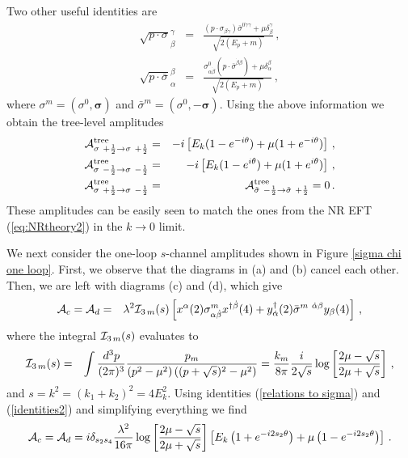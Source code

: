 \documentclass[11pt]{article}
\begin{document}
%
Two other useful identities are  
%
\begin{eqnarray}
\nonumber
\sqrt{p\cdot \sigma}_{\beta}^\gamma&=&\frac{(p\cdot \sigma_{\beta\dot\gamma})\bar\sigma^{0\dot\gamma\gamma}+\mu\delta_{\beta}^\gamma}{\sqrt{2(E_p+m)}}\,,\\
\sqrt{p\cdot \bar\sigma}_{\alpha}^\beta&=&\frac{\sigma^{0}_{\alpha\dot \beta}(p\cdot \bar\sigma^{\dot\beta\beta})+\mu\delta_{\alpha}^\beta}{\sqrt{2(E_p+m)}}\,,
\label{identities2}
\end{eqnarray}
% 
where $\sigma^m=(\sigma^0,\bm \sigma)$ and $\bar\sigma^m=(\sigma^0,-\bm \sigma)$.  Using the above information we obtain the tree-level amplitudes
%
\begin{eqnarray}
\nonumber
{\cal A}^{\scriptsize\mbox{tree}}_{\sigma~+\frac{1}{2}\rightarrow \sigma~+\frac{1}{2}}&=&-i \left[E_k(1-e^{-i\theta})+\mu(1+e^{-i\theta}) \right]\,,\\
\nonumber
{\cal A}^{\scriptsize\mbox{tree}}_{\sigma~-\frac{1}{2}\rightarrow \sigma~-\frac{1}{2}}&=&-i \left[E_k(1-e^{i\theta})+\mu(1+e^{i\theta}) \right]\,,\\
{\cal A}^{\scriptsize\mbox{tree}}_{\sigma~+\frac{1}{2}\rightarrow \sigma~-\frac{1}{2}}&=&{\cal A}^{\scriptsize\mbox{tree}}_{\tilde\sigma~-\frac{1}{2}\rightarrow \tilde\sigma~+\frac{1}{2}}=0\,.
\label{sigma fermion scattering}
\end{eqnarray}
These amplitudes can be easily seen to match the ones from the NR EFT (\ref{eq:NRtheory2}) in the $k \rightarrow 0$ limit.

We next consider the one-loop $s$-channel amplitudes shown in Figure \ref{sigma chi one loop}. First, we observe that the diagrams in (a) and (b) cancel each other. Then, we are left with diagrams (c) and (d), which give 
%
\begin{eqnarray}
{\cal A}_c={\cal A}_d&=&\lambda^2{\cal I}_{3\,m}(s)\left[ x^{\alpha}(2)\sigma^m_{\alpha\dot\beta}x^{\dagger\dot\beta}(4)+ y^\dagger_{\dot\alpha}(2) \bar \sigma^{m~\dot\alpha\beta} y_{\beta}(4)\right]\,,
\end{eqnarray}
%
where the integral ${\cal I}_{3\,m}(s)$ evaluates to
%
\begin{eqnarray}
{\cal I}_{3\,m}(s)&=&\int \frac{d^3p}{(2\pi)^3}\frac{p_m}{\left(p^2-\mu^2\right)\left((p+\sqrt s)^2-\mu^2\right)}=\frac{k_m}{8\pi}\frac{i}{2\sqrt s}\log \left[\frac{2\mu-\sqrt s}{2\mu+\sqrt s}\right]\,,
\end{eqnarray}
%
and $s=k^2=(k_1+k_2)^2=4E_k^2$. Using identities (\ref{relations to sigma}) and (\ref{identities2}) and simplifying everything we find
%
\begin{eqnarray}
{\cal A}_{c}={\cal A}_d=i\delta_{s_2s_4}\frac{\lambda^2}{16\pi}\log\left[\frac{2\mu-\sqrt s}{2\mu+\sqrt s}\right]\left[E_k\left(1+e^{-i2s_2\theta}\right)+\mu\left(1-e^{-i2s_2\theta}\right)  \right]\,.
\end{eqnarray}
%
\end{document}
